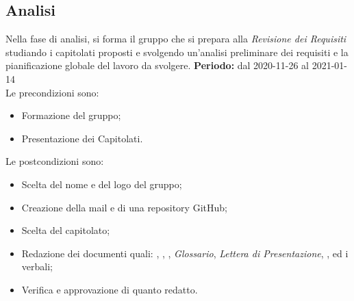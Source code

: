 \subsection{Analisi}
\label{analisi}
Nella fase di analisi, si forma il gruppo che si prepara alla \textit{Revisione dei Requisiti} studiando i capitolati proposti e svolgendo un'analisi preliminare dei requisiti e la pianificazione globale del lavoro da svolgere.
\textbf{Periodo:} dal 2020-11-26 al 2021-01-14\\

Le precondizioni sono:
\begin{itemize}
    \item Formazione del gruppo;
    \item Presentazione dei Capitolati.
\end{itemize}

Le postcondizioni sono:
\begin{itemize}
    \item Scelta del nome e del logo del gruppo;
    \item Creazione della mail e di una repository GitHub;
    \item Scelta del capitolato;
    \item Redazione dei documenti quali: \textit{\SdF}, \textit{\NdP}, \textit{\PdP}, \textit{Glossario}, \textit{Lettera di Presentazione}, \textit{\PdQ}, \textit{\AdR} ed i verbali;
    \item Verifica e approvazione di quanto redatto.
\end{itemize}

